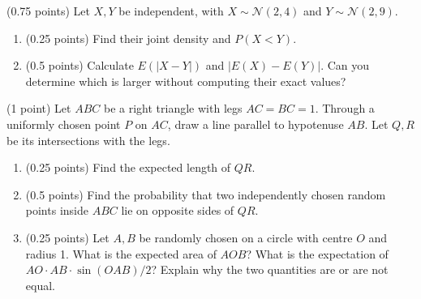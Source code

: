 \documentclass[a4paper]{report}
\begin{document}
\begin{problem}
(0.75 points)
Let $X,Y$ be independent, with $X\sim\mathcal N(2,4)$ and
$Y \sim \mathcal{N}(2, 9)$.
\begin{enumerate}
    \item (0.25 points) Find their joint density and $P(X<Y)$.
    \item (0.5 points) Calculate $E(|X-Y|)$ and $|E(X)-E(Y)|$.
    Can you determine which is larger without computing their exact values?
\end{enumerate}
\end{problem}


\begin{problem}
(1 point)
Let $ABC$ be a right triangle with legs $AC=BC=1$.
Through a uniformly chosen point $P$ on $AC$, draw a line parallel to hypotenuse $AB$.
Let $Q,R$ be its intersections with the legs.
\begin{enumerate}
    \item (0.25 points) Find the expected length of $QR$.
    \item (0.5 points) Find the probability that two independently chosen random points inside $ABC$ lie on opposite sides of $QR$.
    \item (0.25 points) Let $A,B$ be randomly chosen on
    a circle with centre $O$ and radius 1. What is the expected area of $AOB$? What is the expectation of $AO\cdot AB\cdot\sin(OAB)/2$? Explain why the two quantities are or are not equal.
\end{enumerate}
\end{problem}
\pagebreak
\end{document}
